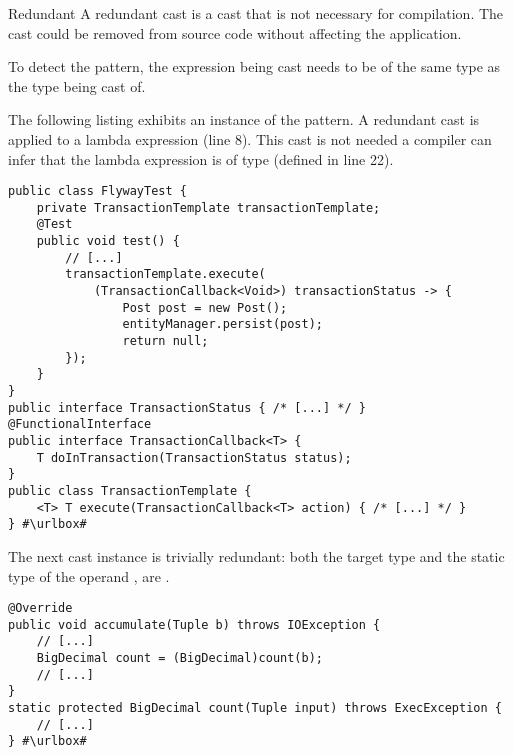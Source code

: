 \begin{pattern}{Redundant}
A redundant cast is a cast that is not necessary for compilation.
The cast could be removed from source code without affecting the application.

To detect the \thisp{} pattern, 
the expression being cast needs to be of the same type as the type being cast of.

\instances{}
The following listing exhibits an instance of the \thisp{} pattern.
A redundant cast is applied to a lambda expression (line 8).
This cast is not needed a \java{} compiler can infer that the lambda expression is of type  (defined in line 22).

\def\urlvar{http://bit.ly/vladmihalcea_high_performance_java_persistence_2FWXw2e}
\begin{verbatim}
public class FlywayTest {
    private TransactionTemplate transactionTemplate;
    @Test
    public void test() {
        // [...]
        transactionTemplate.execute(
            (TransactionCallback<Void>) transactionStatus -> {
                Post post = new Post();
                entityManager.persist(post);
                return null;
        });
    }
}
public interface TransactionStatus { /* [...] */ }
@FunctionalInterface
public interface TransactionCallback<T> {	
	T doInTransaction(TransactionStatus status);
}
public class TransactionTemplate {
	<T> T execute(TransactionCallback<T> action) { /* [...] */ }
} #\urlbox#
\end{verbatim}

The next cast instance is trivially redundant:
both the target type and the static type of the operand ,
are .

\def\urlvar{http://bit.ly/sigmoidanalytics_spork_2SIqWYq}
\begin{verbatim}
@Override
public void accumulate(Tuple b) throws IOException {
    // [...]
    BigDecimal count = (BigDecimal)count(b);
    // [...]
}
static protected BigDecimal count(Tuple input) throws ExecException {
    // [...]
} #\urlbox#
\end{verbatim}


\end{pattern}

